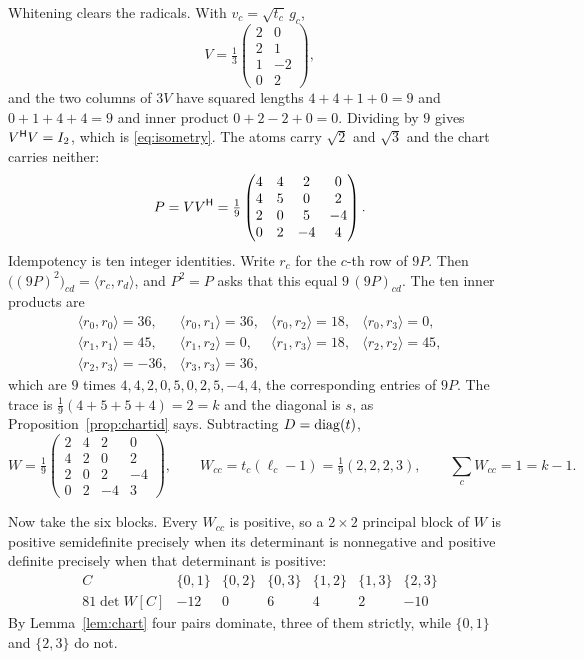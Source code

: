 \begin{example}
Whitening clears the radicals.  With $v_c=\sqrt{t_c}\,g_c$,
\[
  V=\tfrac13\begin{pmatrix}2&0\\2&1\\1&-2\\0&2\end{pmatrix},
\]
and the two columns of $3V$ have squared lengths $4+4+1+0=9$ and
$0+1+4+4=9$ and inner product $0+2-2+0=0$.  Dividing by $9$ gives
$V^{\mathsf{H}} V=I_2$, which is \eqref{eq:isometry}.  The atoms carry $\sqrt2$ and
$\sqrt3$ and the chart carries neither:
\[
  P=VV^{\mathsf{H}}=\tfrac19\begin{pmatrix}
    4&4&2&0\\ 4&5&0&2\\ 2&0&5&-4\\ 0&2&-4&4\end{pmatrix}.
\]
Idempotency is ten integer identities.  Write $r_c$ for the $c$-th row of
$9P$.  Then $\bigl((9P)^2\bigr)_{cd}=\langle r_c,r_d\rangle$, and $P^2=P$
asks that this equal $9\,(9P)_{cd}$.  The ten inner products are
\[
  \begin{array}{llll}
  \langle r_0,r_0\rangle=36, & \langle r_0,r_1\rangle=36,
    & \langle r_0,r_2\rangle=18, & \langle r_0,r_3\rangle=0,\\[2pt]
  \langle r_1,r_1\rangle=45, & \langle r_1,r_2\rangle=0,
    & \langle r_1,r_3\rangle=18, & \langle r_2,r_2\rangle=45,\\[2pt]
  \langle r_2,r_3\rangle=-36, & \langle r_3,r_3\rangle=36,
  \end{array}
\]
which are $9$ times $4,4,2,0,5,0,2,5,-4,4$, the corresponding entries of
$9P$.  The trace is $\tfrac19(4+5+5+4)=2=k$ and the diagonal is $s$, as
Proposition~\ref{prop:chartid} says.  Subtracting $D=\operatorname{diag}(t)$,
\[
  W=\tfrac19\begin{pmatrix}
    2&4&2&0\\ 4&2&0&2\\ 2&0&2&-4\\ 0&2&-4&3\end{pmatrix},
  \qquad
  W_{cc}=t_c(\ell_c-1)=\tfrac19(2,2,2,3),
  \qquad \textstyle\sum_cW_{cc}=1=k-1 .
\]

Now take the six blocks.  Every $W_{cc}$ is positive, so a $2\times2$
principal block of $W$ is positive semidefinite precisely when its
determinant is nonnegative and positive definite precisely when that
determinant is positive:
\[
  \begin{array}{r|rrrrrr}
  C & \{0,1\} & \{0,2\} & \{0,3\} & \{1,2\} & \{1,3\} & \{2,3\}\\[2pt]
  81\det W[C] & -12 & 0 & 6 & 4 & 2 & -10
  \end{array}
\]
By Lemma~\ref{lem:chart} four pairs dominate, three of them strictly,
while $\{0,1\}$ and $\{2,3\}$ do not.


\end{example}
